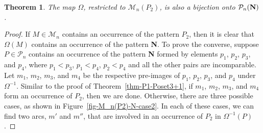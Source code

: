 \documentclass[11pt]{article}
\newtheorem{thm}{Theorem}[section]
\newcommand{\M}{\mathcal{M}}
\begin{document}
	\begin{thm} \label{thm-P2-N}
		The map $\Omega$, restricted to $\M_n(P_2)$, is also a bijection onto $\mathcal{P}_n{\bf {(N)}}$.
	\end{thm}
	\begin{proof}
		If $M\in\M_n$ contains an occurrence of the pattern $P_2$, then it is clear that $\Omega(M)$ contains an occurrence of the pattern \textbf{N}.
		To prove the converse, suppose $P \in \mathcal{P}_n$ contains an occurrence of the pattern \textbf{N} formed by elements $p_1$, $p_2$, $p_3$, and $p_4$, where $p_1 < p_3$, $p_1 < p_4$, $p_2 < p_4$ and all the other pairs are incomparable. Let $m_1$, $m_2$, $m_3$, and $m_4$ be the respective pre-images of $p_1$, $p_2$, $p_3$, and $p_4$ under $\Omega^{-1}$. Similar to the proof of Theorem~\ref{thm-P1-Poset3+1}, if $m_1$, $m_2$, $m_3$, and $m_4$ form an occurrence of $P_2$, then we are done. Otherwise, there are three possible cases, as shown in Figure~\ref{fig-M_n(P2)-N-case2}. In each of these cases, we can find two arcs, $m'$ and $m''$, that are involved  in an occurrence of $P_2$ in $\Omega^{-1}(P)$. 
	\end{proof}
	
\end{document}
